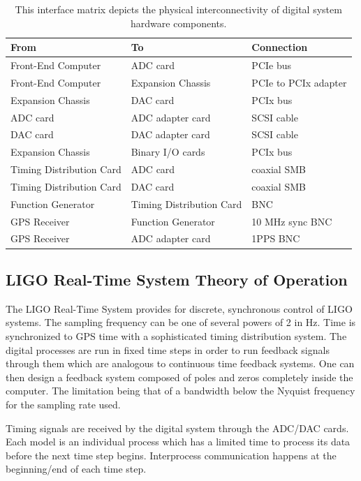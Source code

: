 \begin{table}
\begin{center}
\begin{tabular}{ | l | l | l | }
\hline
From & To & Connection \\
\hline
Front-End Computer & ADC card & PCIe bus \\
Front-End Computer & Expansion Chassis & PCIe to PCIx adapter \\
Expansion Chassis & DAC card & PCIx bus \\
ADC card & ADC adapter card & SCSI cable \\
DAC card & DAC adapter card & SCSI cable \\
Expansion Chassis & Binary I/O cards & PCIx bus \\
Timing Distribution Card & ADC card & coaxial SMB \\
Timing Distribution Card & DAC card & coaxial SMB \\
Function Generator & Timing Distribution Card & BNC \\
GPS Receiver & Function Generator & 10 MHz sync BNC \\
GPS Receiver & ADC adapter card & 1PPS BNC \\
\hline
\end{tabular}
\end{center}
\caption[Digital System Hardware Interface Matrix]{This interface matrix depicts
the physical interconnectivity of digital system hardware components.
}
\end{table}

\subsection{LIGO Real-Time System Theory of Operation}

The LIGO Real-Time System provides for discrete, synchronous control of LIGO
systems. The sampling frequency can be one of several powers of 2 in Hz.
Time is synchronized to GPS time with a sophisticated timing distribution
system. The digital processes are run in fixed time steps in order to run
feedback signals through them which are analogous to continuous time feedback
systems. One can then design a feedback system composed of poles and zeros
completely inside the computer. The limitation being that of a bandwidth below
the Nyquist frequency for the sampling rate used.

Timing signals are received by the digital system through the ADC/DAC cards.
Each model is an individual process which has a limited time to process its
data before the next time step begins. Interprocess communication happens at
the beginning/end of each time step.


